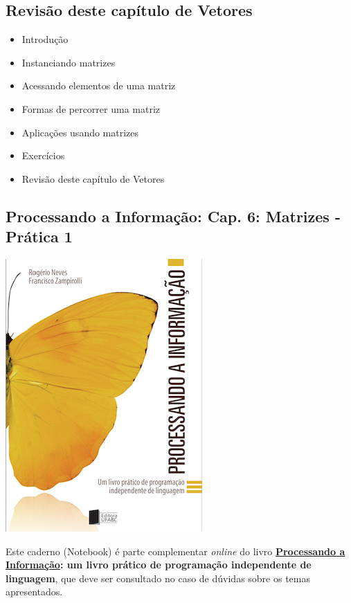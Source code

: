 \documentclass[12pt,a4paper]{article}
\providecommand{\tightlist}{%
      \setlength{\itemsep}{0pt}\setlength{\parskip}{0pt}}
\begin{document}
    \hypertarget{revisuxe3o-deste-capuxedtulo-de-vetores}{%
\subsection{Revisão deste capítulo de
Vetores}\label{revisuxe3o-deste-capuxedtulo-de-vetores}}

\begin{itemize}
\tightlist
\item
  Introdução
\item
  Instanciando matrizes
\item
  Acessando elementos de uma matriz
\item
  Formas de percorrer uma matriz
\item
  Aplicações usando matrizes
\item
  Exercícios
\item
  Revisão deste capítulo de Vetores
\end{itemize}

    \hypertarget{processando-a-informauxe7uxe3o-cap.-6-matrizes---pruxe1tica-1}{%
\subsection{Processando a Informação: Cap. 6: Matrizes - Prática
1}\label{processando-a-informauxe7uxe3o-cap.-6-matrizes---pruxe1tica-1}}

    \includegraphics{"figs/Capa_Processando_Informacao.jpg"}

Este caderno (Notebook) é parte complementar \emph{online} do livro
\textbf{\href{https://editora.ufabc.edu.br/matematica-e-ciencias-da-computacao/58-processando-a-informacao}{Processando
a Informação}: um livro prático de programação independente de
linguagem}, que deve ser consultado no caso de dúvidas sobre os temas
apresentados.
\end{document}
